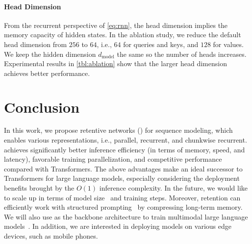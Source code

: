 \paragraph{Head Dimension} From the recurrent perspective of \ref{eq:rnn}, the head dimension implies the memory capacity of hidden states. In the ablation study, we reduce the default head dimension from $256$ to $64$, i.e., $64$ for queries and keys, and $128$ for values. We keep the hidden dimension $d_\text{model}$ the same so the number of heads increases. Experimental results in \ref{tbl:ablation} show that the larger head dimension achieves better performance.

\section{Conclusion}

In this work, we propose retentive networks (\our{}) for sequence modeling, which enables various representations, i.e., parallel, recurrent, and chunkwise recurrent.
\our{} achieves significantly better inference efficiency (in terms of memory, speed, and latency), favorable training parallelization, and competitive performance compared with Transformers. The above advantages make \our{} an ideal successor to Transformers for large language models, especially considering the deployment benefits brought by the $O(1)$ inference complexity. In the future, we would like to scale up \our{} in terms of model size~\cite{xmoe} and training steps. Moreover, retention can efficiently work with structured prompting~\cite{structured:prompt} by compressing long-term memory. We will also use \our{} as the backbone architecture to train multimodal large language models~\cite{metalm,kosmos-1,kosmos-2}. In addition, we are interested in deploying \our{} models on various edge devices, such as mobile phones.


